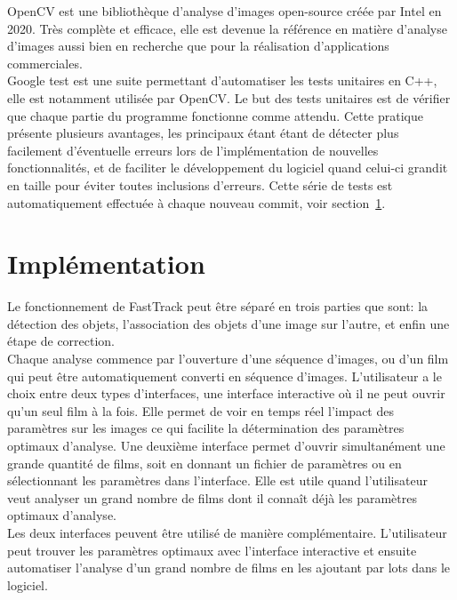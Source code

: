 	OpenCV est une bibliothèque d'analyse d'images open-source créée par Intel en 2020. Très complète et efficace, elle est devenue la référence en matière d'analyse d'images aussi bien en recherche que pour la réalisation d'applications commerciales.\\
	
	Google test est une suite permettant d'automatiser les tests unitaires en C++, elle est notamment utilisée par OpenCV. Le but des tests unitaires est de vérifier que chaque partie du programme fonctionne comme attendu. Cette pratique présente plusieurs avantages, les principaux étant étant de détecter plus facilement d'éventuelle erreurs lors de l'implémentation de nouvelles fonctionnalités, et de faciliter le développement du logiciel quand celui-ci grandit en taille pour éviter toutes inclusions d'erreurs. Cette série de tests est automatiquement effectuée à chaque nouveau commit, voir section~\ref{}.
	
	\section{Implémentation}
	
	Le fonctionnement de FastTrack peut être séparé en trois parties que sont: la détection des objets, l'association des objets d'une image sur l'autre, et enfin une étape de correction.\\
	
	Chaque analyse commence par l'ouverture d'une séquence d'images, ou d'un film qui peut être automatiquement converti en séquence d'images. L'utilisateur a le choix entre deux types d'interfaces, une interface interactive où il ne peut ouvrir qu'un seul film à la fois. Elle permet de voir en temps réel l'impact des paramètres sur les images ce qui facilite la détermination des paramètres optimaux d'analyse. Une deuxième interface permet d'ouvrir simultanément une grande quantité de films, soit en donnant un fichier de paramètres ou en sélectionnant les paramètres dans l'interface. Elle est utile quand l'utilisateur veut analyser un grand nombre de films dont il connaît déjà les paramètres optimaux d'analyse.\\
	
	Les deux interfaces peuvent être utilisé de manière complémentaire. L'utilisateur peut trouver les paramètres optimaux avec l'interface interactive et ensuite automatiser l'analyse d'un grand nombre de films en les ajoutant par lots dans le logiciel.
	
